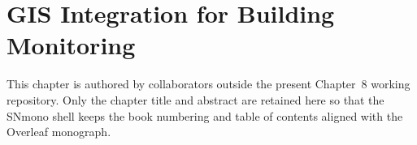 \chapter{GIS Integration for Building Monitoring}
\label{ch:gis}




This chapter is authored by collaborators outside the present Chapter~8 working repository. Only the chapter title and abstract are retained here so that the SNmono shell keeps the book numbering and table of contents aligned with the Overleaf monograph.
